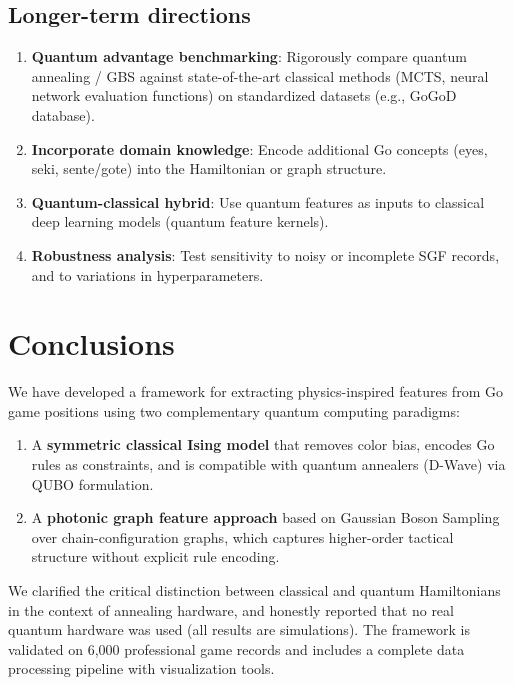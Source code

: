 \documentclass[aps,prl,reprint]{revtex4-2}
\begin{document}
\subsection{Longer-term directions}

\begin{enumerate}
	\item \textbf{Quantum advantage benchmarking}: Rigorously compare quantum annealing / GBS against state-of-the-art classical methods (MCTS, neural network evaluation functions) on standardized datasets (e.g., GoGoD database).
	
	\item \textbf{Incorporate domain knowledge}: Encode additional Go concepts (eyes, seki, sente/gote) into the Hamiltonian or graph structure.
	
	\item \textbf{Quantum-classical hybrid}: Use quantum features as inputs to classical deep learning models (quantum feature kernels).
	
	\item \textbf{Robustness analysis}: Test sensitivity to noisy or incomplete SGF records, and to variations in hyperparameters.
\end{enumerate}

\section{Conclusions}

We have developed a framework for extracting physics-inspired features from Go game positions using two complementary quantum computing paradigms:

\begin{enumerate}
	\item A \textbf{symmetric classical Ising model} that removes color bias, encodes Go rules as constraints, and is compatible with quantum annealers (D-Wave) via QUBO formulation.
	
	\item A \textbf{photonic graph feature approach} based on Gaussian Boson Sampling over chain-configuration graphs, which captures higher-order tactical structure without explicit rule encoding.
\end{enumerate}

We clarified the critical distinction between classical and quantum Hamiltonians in the context of annealing hardware, and honestly reported that no real quantum hardware was used (all results are simulations). The framework is validated on 6,000 professional game records and includes a complete data processing pipeline with visualization tools.
\end{document}
